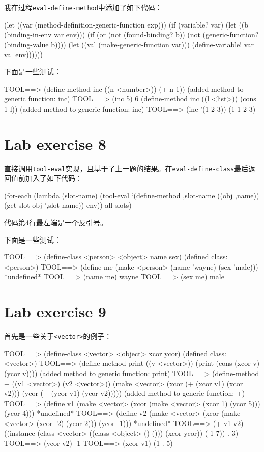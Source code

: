 \documentclass[a4paper]{article}
\newcommand{\code}[1]{\mbox{\tt #1}}
\begin{document}
我在过程\code{eval-define-method}中添加了如下代码：

\beginlisp
(let ((var (method-definition-generic-function exp)))
  (if (variable? var)
    (let ((b (binding-in-env var env)))
      (if (or 
            (not (found-binding? b))
            (not (generic-function? (binding-value b))))
        (let ((val (make-generic-function var)))
          (define-variable! var val env))))))
\null
\endlisp

下面是一些测试：

\beginlisp
TOOL==> (define-method inc ((n <number>)) (+ n 1))
(added method to generic function: inc)
\null
TOOL==> (inc 5)
6
\null
(define-method inc ((l <list>)) (cons 1 l))
(added method to generic function: inc)
\null
TOOL==> (inc '(1 2 3))
(1 1 2 3)
\endlisp

\section{Lab exercise 8}

直接调用\code{tool-eval}实现，且基于了上一题的结果。在\code{eval-define-class}最后返回值前加入了如下代码：

\beginlisp
(for-each
  (lambda (slot-name)
    (tool-eval
      `(define-method ,slot-name ((obj ,name)) (get-slot obj ',slot-name))
      env))
  all-slots)
\null
\endlisp

代码第4行最左端是一个反引号。

下面是一些测试：

\beginlisp
TOOL==> (define-class <person> <object> name sex)
(defined class: <person>)
\null
TOOL==> (define me (make <person> (name 'wayne) (sex 'male)))
*undefined*
\null
TOOL==> (name me)
wayne
\null
TOOL==> (sex me)
male
\endlisp

\section{Lab exercise 9}

首先是一些关于\code{<vector>}的例子：

\beginlisp
TOOL==> (define-class <vector> <object> xcor ycor)
(defined class: <vector>)
\null
TOOL==> (define-method print ((v <vector>))
          (print (cons (xcor v) (ycor v))))
(added method to generic function: print)
\null
TOOL==> (define-method + ((v1 <vector>) (v2 <vector>))
          (make <vector>
                (xcor (+ (xcor v1) (xcor v2)))
                (ycor (+ (ycor v1) (ycor v2)))))
(added method to generic function: +)
\null
TOOL==> (define v1 
          (make <vector>
                (xcor (make <vector> (xcor 1) (ycor 5)))
                (ycor 4)))
*undefined*
TOOL==> (define v2
          (make <vector>
                (xcor (make <vector> (xcor -2) (ycor 2)))
                (ycor -1)))
*undefined*
\null
TOOL==> (+ v1 v2)
((instance (class <vector> ((class <object> () ())) (xcor ycor)) (-1 7)) . 3)
\null
TOOL==> (ycor v2)
-1
\null
TOOL==> (xcor v1)
(1 . 5)
\null
\endlisp
\end{document}
